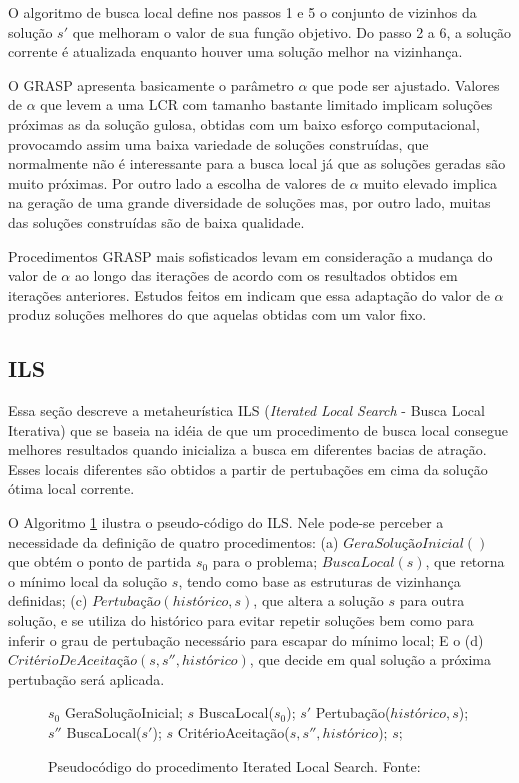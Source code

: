 O algoritmo de busca local define nos passos 1 e 5 o conjunto de vizinhos da
solução $s{'}$ que melhoram o valor de sua função objetivo. Do passo 2 a 6, a
solução corrente é atualizada enquanto houver uma solução melhor na vizinhança.

O GRASP apresenta basicamente o parâmetro $\alpha$ que pode ser ajustado.
Valores de $\alpha$ que levem a uma LCR com tamanho bastante limitado implicam
soluções próximas as da solução gulosa, obtidas com um baixo esforço
computacional, provocamdo assim uma baixa variedade de soluções construídas, que
normalmente não é interessante para a busca local já que as soluções geradas
são muito próximas. Por outro lado a escolha de valores de $\alpha$ muito
elevado implica na geração de uma grande diversidade de soluções mas, por
outro lado, muitas das soluções construídas são de baixa qualidade.

Procedimentos GRASP mais sofisticados levam em consideração a mudança do valor
de $\alpha$ ao longo das iterações de acordo com os resultados obtidos em
iterações anteriores. Estudos feitos em \cite{prais2000} indicam que essa
adaptação do valor de $\alpha$ produz soluções melhores do que aquelas obtidas
com um valor fixo.

\subsection{ILS}

Essa seção descreve a metaheurística ILS (\textit{Iterated Local Search} -
Busca Local Iterativa) que se baseia na idéia de que um procedimento de busca local
consegue melhores resultados quando inicializa a busca em diferentes bacias de
atração. Esses locais diferentes são obtidos a partir de pertubações em cima da
solução ótima local corrente.

O Algoritmo \ref{alg:ils} ilustra o pseudo-código do ILS. Nele pode-se perceber
a necessidade da definição de quatro procedimentos: (a) $GeraSoluçãoInicial()$
que obtém o ponto de partida $s_{0}$ para o problema; $BuscaLocal(s)$, que
retorna o mínimo local da solução $s$, tendo como base as estruturas de
vizinhança definidas; (c) $Pertubação(histórico, s)$, que altera a solução $s$
para outra solução, e se utiliza do histórico para evitar repetir soluções bem
como para inferir o grau de pertubação necessário para escapar do mínimo local;
E o (d) $CritérioDeAceitação(s, s{''}, histórico)$, que decide em qual solução
a próxima pertubação será aplicada.

\begin{figure}[h]
\caption{Pseudocódigo do procedimento Iterated Local Search. \newline
\mbox{Fonte:
\cite{notasmarcone}}}\label{alg:ils}
\begin{programma}
\STATE $s_{0}$ \GETS GeraSoluçãoInicial;
\STATE $s$ \GETS BuscaLocal($s_{0}$);
\STATE $s{'}$ \GETS Pertubação($histórico, s$);
\STATE $s{''}$ \GETS BuscaLocal($s{'}$);
\STATE $s$ \GETS CritérioAceitação($s, s{''}, histórico$);
\ENDWHILE
\STATE\RETURN $s$;
\ENDALGORITHM
\end{programma}
\end{figure}

